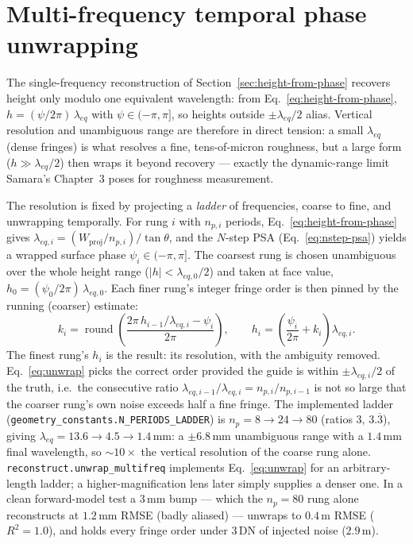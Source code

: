 \documentclass[11pt]{article}
\begin{document}
\section{Multi-frequency temporal phase unwrapping}
\label{sec:multifreq}

The single-frequency reconstruction of Section~\ref{sec:height-from-phase}
recovers height only modulo one equivalent wavelength: from
Eq.~\ref{eq:height-from-phase}, $h = (\psi/2\pi)\,\lambda_{eq}$ with
$\psi\in(-\pi,\pi]$, so heights outside $\pm\lambda_{eq}/2$ alias. Vertical
resolution and unambiguous range are therefore in direct tension: a small
$\lambda_{eq}$ (dense fringes) is what resolves a fine, tens-of-micron
roughness, but a large form ($h\gg\lambda_{eq}/2$) then wraps it beyond
recovery --- exactly the dynamic-range limit Samara's Chapter~3 poses for
roughness measurement.

The resolution is fixed by projecting a \emph{ladder} of frequencies,
coarse to fine, and unwrapping temporally. For rung $i$ with $n_{p,i}$
periods, Eq.~\ref{eq:height-from-phase} gives $\lambda_{eq,i} =
(W_{\text{proj}}/n_{p,i})/\tan\theta$, and the $N$-step PSA
(Eq.~\ref{eq:nstep-psa}) yields a wrapped surface phase $\psi_i\in(-\pi,\pi]$.
The coarsest rung is chosen unambiguous over the whole height range
($|h|<\lambda_{eq,0}/2$) and taken at face value, $h_0 =
(\psi_0/2\pi)\,\lambda_{eq,0}$. Each finer rung's integer fringe order is
then pinned by the running (coarser) estimate:
\begin{equation}
  k_i = \operatorname{round}\!\left(\frac{2\pi\,h_{i-1}/\lambda_{eq,i} -
  \psi_i}{2\pi}\right), \qquad
  h_i = \left(\frac{\psi_i}{2\pi} + k_i\right)\lambda_{eq,i}.
  \label{eq:unwrap}
\end{equation}
The finest rung's $h_i$ is the result: its resolution, with the ambiguity
removed. Eq.~\ref{eq:unwrap} picks the correct order provided the guide is
within $\pm\lambda_{eq,i}/2$ of the truth, i.e.\ the consecutive ratio
$\lambda_{eq,i-1}/\lambda_{eq,i} = n_{p,i}/n_{p,i-1}$ is not so large that
the coarser rung's own noise exceeds half a fine fringe. The implemented
ladder (\texttt{geometry\_constants.N\_PERIODS\_LADDER}) is $n_p =
8\to24\to80$ (ratios $3,\,3.\overline{3}$), giving $\lambda_{eq} =
13.6\to4.5\to1.4$\,mm: a $\pm6.8$\,mm unambiguous range with a
$1.4$\,mm final wavelength, so $\sim\!10\times$ the vertical resolution of
the coarse rung alone. \texttt{reconstruct.unwrap\_multifreq} implements
Eq.~\ref{eq:unwrap} for an arbitrary-length ladder; a higher-magnification
lens later simply supplies a denser one. In a clean forward-model test a
$3$\,mm bump --- which the $n_p=80$ rung alone reconstructs at $1.2$\,mm
RMSE (badly aliased) --- unwraps to $0.4$\,\textmu m RMSE ($R^2=1.0$), and
holds every fringe order under $3$\,DN of injected noise ($2.9$\,\textmu m).
\end{document}
